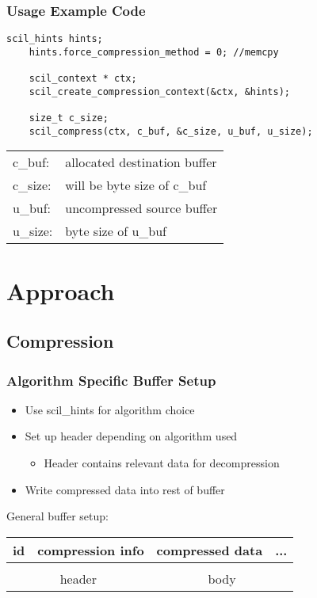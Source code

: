 \documentclass[compress]{beamer}
\begin{document}
\begin{frame}[fragile]
	\frametitle{Usage Example Code}

	\begin{lstlisting}[caption=SCIL usage example]
	scil_hints hints;
	hints.force_compression_method = 0; //memcpy

	scil_context * ctx;
	scil_create_compression_context(&ctx, &hints);

	size_t c_size;
	scil_compress(ctx, c_buf, &c_size, u_buf, u_size);
	\end{lstlisting}

	\footnotesize{
	\begin{tabular}{ll}
		c\_buf: & allocated destination buffer \\
		c\_size: & will be byte size of c\_buf \\
		u\_buf: & uncompressed source buffer \\
		u\_size: & byte size of u\_buf
	\end{tabular}
	}

\end{frame}

\section{Approach}
\subsection{Compression}

\begin{frame}
	\frametitle{Algorithm Specific Buffer Setup}

	\begin{itemize}
		\item Use scil\_hints for algorithm choice
		\item Set up header depending on algorithm used
		\begin{itemize}
			\item Header contains relevant data for decompression
		\end{itemize}
		\item Write compressed data into rest of buffer
	\end{itemize}

	\bigskip

	General buffer setup:\\
	\begin{center}
	\begin{tabular}{|c|c|cc|}
		\hline
		id & compression info & compressed data & ... \\
		\hline
		\multicolumn{2}{|c|}{} & \multicolumn{2}{c|}{} \\
		\multicolumn{2}{c}{header} & \multicolumn{2}{c}{body}
	\end{tabular}
	\end{center}
\end{frame}
\end{document}
